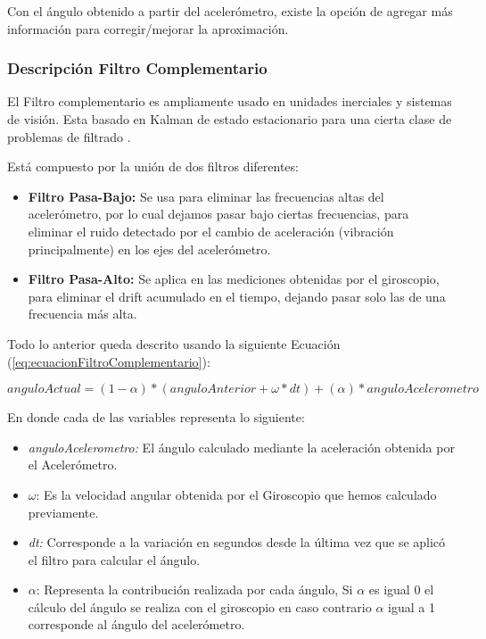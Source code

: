 \documentclass[12pt,a4paper]{article}
\begin{document}
Con el ángulo obtenido a partir del acelerómetro, existe la opción de agregar más información para corregir/mejorar la aproximación.


\subsubsection{Descripción Filtro Complementario}
El Filtro complementario es ampliamente usado en unidades inerciales y sistemas de visión. Esta basado en Kalman de estado estacionario para una cierta clase de problemas de filtrado \cite{TesisUSM}.

Está compuesto por la unión de dos filtros diferentes:
\begin{itemize}
	\item \textbf{Filtro Pasa-Bajo:} Se usa para eliminar las frecuencias altas del acelerómetro, por lo cual dejamos pasar bajo ciertas frecuencias, para eliminar el ruido detectado por el cambio de aceleración (vibración principalmente) en los ejes del acelerómetro.
	\item \textbf{Filtro Pasa-Alto:} Se aplica en las mediciones obtenidas por el giroscopio, para eliminar el drift acumulado en el tiempo, dejando pasar solo las de una frecuencia más alta.
\end{itemize}

Todo lo anterior queda descrito usando la siguiente Ecuación (\ref{eq:ecuacionFiltroComplementario}):

\begin{equation}
\label{eq:ecuacionFiltroComplementario}
anguloActual = (1-\alpha)*(anguloAnterior+\omega*dt)+(\alpha)*anguloAcelerometro
\end{equation}

En donde cada de las variables representa lo siguiente:
\begin{itemize}
	\item \textit{anguloAcelerometro:} El ángulo calculado mediante la aceleración obtenida por el Acelerómetro.
	\item $\omega$: Es la velocidad angular obtenida por el Giroscopio que hemos calculado previamente.
	\item \textit{dt:} Corresponde a la variación en segundos desde la última vez que se aplicó el filtro para calcular el ángulo.
	\item $\alpha$: Representa la contribución realizada por cada ángulo, Si $\alpha$ es igual 0 el cálculo del ángulo se realiza con el giroscopio en caso contrario $\alpha$ igual a 1 corresponde al ángulo del acelerómetro.
\end{itemize}
\end{document}
